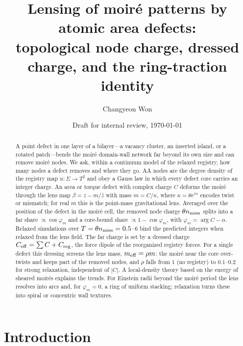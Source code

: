\documentclass[prb,twocolumn,superscriptaddress,floatfix,10pt]{revtex4-2}
\begin{document}
\title{Lensing of moir\'e patterns by atomic area defects:\\ topological node charge, dressed charge, and the ring-traction identity}

\author{Changyeon Won}
\noaffiliation

\date{Draft for internal review, \today}

\begin{abstract}
A point defect in one layer of a bilayer---a vacancy cluster, an inserted island, or a rotated patch---bends the moir\'e domain-wall network far beyond its own size and can remove moir\'e nodes. We ask, within a continuum model of the relaxed registry, how many nodes a defect removes and where they go. AA nodes are the degree density of the registry map $u:\Sigma\to T^2$ and obey a Gauss law in which every defect core carries an integer charge. An area or torque defect with complex charge $C$ deforms the moir\'e through the lens map $\beta=z-m/\bar z$ with mass $m=C/\kappa$, where $\kappa=\theta e^{i\alpha}$ encodes twist or mismatch; for real $m$ this is the point-mass gravitational lens. Averaged over the position of the defect in the moir\'e cell, the removed node charge $\theta n_{\rm miss}$ splits into a far share $\propto\cos\varphi_m$ and a core-bound share $\propto1-\cos\varphi_m$, with $\varphi_m=\arg C-\alpha$. Relaxed simulations over $T=\theta n_{\rm miss}=0.5$--$6$ bind the predicted integers when relaxed from the lens field. The far charge is set by a dressed charge $C_{\rm eff}=\sum C+C_{\rm reg}$, the force dipole of the reorganized registry forces. For a single defect this dressing screens the lens mass, $m_{\rm eff}=\rho m$: the moir\'e near the core over-twists and keeps part of the removed nodes, and $\rho$ falls from $1$ (no registry) to $0.1$--$0.2$ for strong relaxation, independent of $|C|$. A local-density theory based on the energy of sheared moir\'es explains the trends. For Einstein radii beyond the moir\'e period the lens resolves into arcs and, for $\varphi_m=0$, a ring of uniform stacking; relaxation turns these into spiral or concentric wall textures.
\end{abstract}

\maketitle

\section{Introduction}
\end{document}
